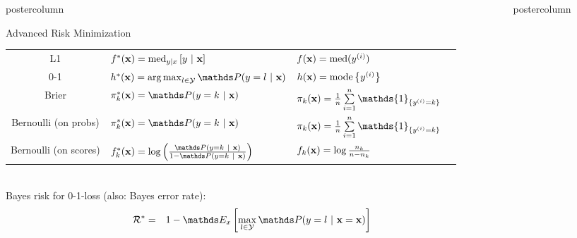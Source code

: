 \documentclass{beamer}
\newlength{\columnheight} %
\begin{document}
\begin{frame}[fragile]{}
\begin{columns}
\begin{column}{.31\textwidth}
\begin{beamercolorbox}[center]{postercolumn}
\begin{minipage}{.98\textwidth}
{\begin{myblock}{Advanced Risk Minimization}
{{\begin{table}[]
\begin{tabular}{c|lll}
												L1 & $f^{\ast}(\mathbf{x}) = \text{med}_{y|x} \left[y ~|~ \mathbf{x} \right]$ & $f(\mathbf{x}) = \text{med}(y^{(i)})$\\
												0-1 & $\hxbayes = \argmax_{l \in \Yspace} \P(y = l~|~ \xv)$  & $h(\mathbf{x}) = \text{mode} \left\{y^{(i)}\right\}$ \\
												Brier & $\pi^*_k(\xv) = \P(y = k~|~\xv)$ & $\pikx =  \frac{1}{n} \sumin \mathds{1}_{\{\yi = k\}}$\\
												Bernoulli (on probs) & $\pi^*_k(\xv) = \P(y = k~|~\xv)$ & $\pikx =  \frac{1}{n} \sumin \mathds{1}_{\{\yi = k\}}$ \\
												Bernoulli (on scores) & $f^*_k(\xv) = \log\left(\frac{\P(y = k ~|~\xv)}{1 - \P(y = k ~|~\xv)}\right)$ & $f_{k}(\mathbf{x}) = \log \frac{n_{k}}{n - n_{k}}$  
											\end{tabular}
										\end{table}
									}
								}\\

								Bayes risk for  0-1-loss (also: Bayes error rate):
								\begin{eqnarray*}  
									\riskbayes &=& 1 - \E_x \left[\max_{l \in \Yspace} \P(y = l~|~ \xv = \xv)\right]
								\end{eqnarray*}

							\end{myblock}\vfill
						}
					\end{minipage}
				\end{beamercolorbox}
			\end{column}
			\begin{column}{.31\textwidth}
				\begin{beamercolorbox}[center]{postercolumn}
					\begin{minipage}{.98\textwidth}
						\parbox[t][\columnheight]{\textwidth}{
							\begin{myblock}{} \vspace{-4ex}


\end{myblock}}
\end{minipage}
\end{beamercolorbox}
\end{column}
\end{columns}
\end{frame}
\end{document}
